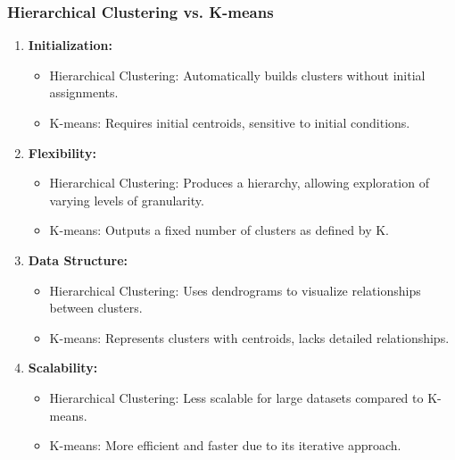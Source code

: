 \documentclass[aspectratio=169]{beamer}
\begin{document}
\begin{frame}[fragile]
    \frametitle{Hierarchical Clustering vs. K-means}
    \begin{enumerate}
        \item \textbf{Initialization:}
            \begin{itemize}
                \item Hierarchical Clustering: Automatically builds clusters without initial assignments.
                \item K-means: Requires initial centroids, sensitive to initial conditions.
            \end{itemize}
        \item \textbf{Flexibility:}
            \begin{itemize}
                \item Hierarchical Clustering: Produces a hierarchy, allowing exploration of varying levels of granularity.
                \item K-means: Outputs a fixed number of clusters as defined by K.
            \end{itemize}
        \item \textbf{Data Structure:}
            \begin{itemize}
                \item Hierarchical Clustering: Uses dendrograms to visualize relationships between clusters.
                \item K-means: Represents clusters with centroids, lacks detailed relationships.
            \end{itemize}
        \item \textbf{Scalability:}
            \begin{itemize}
                \item Hierarchical Clustering: Less scalable for large datasets compared to K-means.
                \item K-means: More efficient and faster due to its iterative approach.
            \end{itemize}
    \end{enumerate}
\end{frame}
\end{document}
